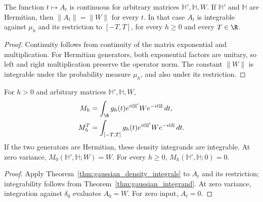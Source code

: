 \begin{theorem}
    \label{thm:gaussian_integrand}
    \leanok
    The function $t\mapsto A_t$ is continuous for arbitrary matrices
    $\mathbb H',\mathbb H,W$. If $\mathbb H'$ and $\mathbb H$ are
    Hermitian, then $\|A_t\|=\|W\|$ for every $t$.
    In that case $A_t$ is integrable against $\mu_h$ and its restriction
    to $[-T,T]$, for every $h\ge0$ and every $T\in\R$.
\end{theorem}
\begin{proof}\leanok
    Continuity follows from continuity of the matrix exponential and
    multiplication. For Hermitian generators, both exponential factors
    are unitary, so left and right multiplication preserve the operator
    norm. The constant $\|W\|$ is integrable under the probability
    measure $\mu_h$, and also under its restriction.
\end{proof}

\begin{theorem}
    \label{thm:gaussian_filter_density}
    \leanok
    For $h>0$ and arbitrary matrices $\mathbb H',\mathbb H,W$,
    \begin{align}
        M_h&=\int_{\R}g_h(t)e^{it\mathbb H'}We^{-it\mathbb H}\,dt,
        \label{eq:gaussian_filter_density}\\
        M_h^T&=\int_{[-T,T]}g_h(t)e^{it\mathbb H'}We^{-it\mathbb H}\,dt. \notag
    \end{align}
    If the two generators are Hermitian, these density integrands are
    integrable. At zero variance, $M_0(\mathbb H',\mathbb H;W)=W$.
    For every $h\ge0$, $M_h(\mathbb H',\mathbb H;0)=0$.
\end{theorem}
\begin{proof}\leanok
    Apply Theorem~\ref{thm:gaussian_density_integrals} to $A_t$ and its
    restriction; integrability follows from
    Theorem~\ref{thm:gaussian_integrand}. At zero variance, integration
    against $\delta_0$ evaluates $A_0=W$. For zero input, $A_t=0$.
\end{proof}

